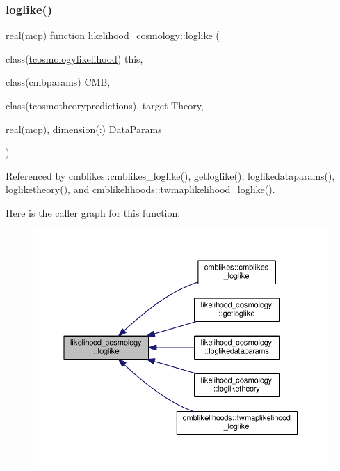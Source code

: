 \subsubsection{\texorpdfstring{loglike()}{loglike()}}
{\footnotesize\ttfamily real(mcp) function likelihood\+\_\+cosmology\+::loglike (\begin{DoxyParamCaption}\item[{class(\mbox{\hyperlink{structlikelihood__cosmology_1_1tcosmologylikelihood}{tcosmologylikelihood}})}]{this,  }\item[{class(cmbparams)}]{C\+MB,  }\item[{class(tcosmotheorypredictions), target}]{Theory,  }\item[{real(mcp), dimension(\+:)}]{Data\+Params }\end{DoxyParamCaption})\hspace{0.3cm}{\ttfamily [private]}}



Referenced by cmblikes\+::cmblikes\+\_\+loglike(), getloglike(), loglikedataparams(), logliketheory(), and cmblikelihoods\+::twmaplikelihood\+\_\+loglike().

Here is the caller graph for this function\+:
\nopagebreak
\begin{figure}[H]
\begin{center}
\leavevmode
\includegraphics[width=350pt]{namespacelikelihood__cosmology_ad4c3f93cdd27d0b291676092a4e2023b_icgraph}
\end{center}
\end{figure}
\mbox{\label{namespacelikelihood__cosmology_a1b2ee95e5e883485f7ba0635f9a5beef}} 

